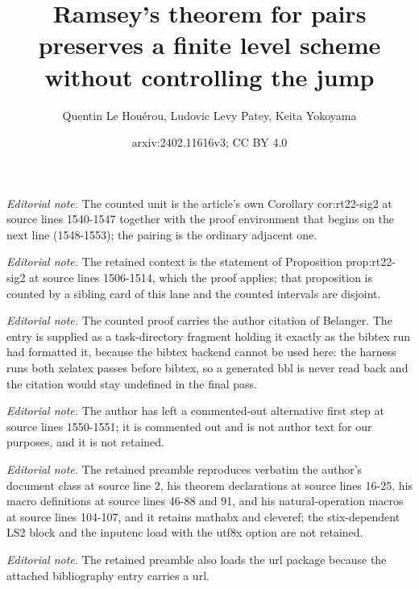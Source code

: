 \documentclass{article}
\title{Ramsey's theorem for pairs preserves a finite level scheme without controlling the jump}
\author{Quentin Le Houérou, Ludovic Levy Patey, Keita Yokoyama}
\date{arxiv:2402.11616v3; CC BY 4.0}
\numberwithin{theorem}{section}
\begin{document}
\maketitle
\noindent\textit{Editorial note.} The counted unit is the article's own Corollary cor:rt22-sig2 at source lines 1540-1547 together with the proof environment that begins on the next line (1548-1553); the pairing is the ordinary adjacent one.\par\medskip
\noindent\textit{Editorial note.} The retained context is the statement of Proposition prop:rt22-sig2 at source lines 1506-1514, which the proof applies; that proposition is counted by a sibling card of this lane and the counted intervals are disjoint.\par\medskip
\noindent\textit{Editorial note.} The counted proof carries the author citation of Belanger. The entry is supplied as a task-directory fragment holding it exactly as the bibtex run had formatted it, because the bibtex backend cannot be used here: the harness runs both xelatex passes before bibtex, so a generated bbl is never read back and the citation would stay undefined in the final pass.\par\medskip
\noindent\textit{Editorial note.} The author has left a commented-out alternative first step at source lines 1550-1551; it is commented out and is not author text for our purposes, and it is not retained.\par\medskip
\noindent\textit{Editorial note.} The retained preamble reproduces verbatim the author's document class at source line 2, his theorem declarations at source lines 16-25, his macro definitions at source lines 46-88 and 91, and his natural-operation macros at source lines 104-107, and it retains mathabx and cleveref; the stix-dependent LS2 block and the inputenc load with the utf8x option are not retained.\par\medskip
\noindent\textit{Editorial note.} The retained preamble also loads the url package because the attached bibliography entry carries a url.\par\medskip
\end{document}
